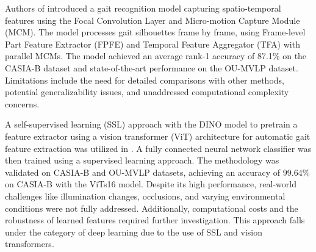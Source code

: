 \documentclass[a4paper]{article}
\begin{document}
Authors of \cite{19} introduced a gait recognition model capturing spatio-temporal features using the Focal Convolution Layer and Micro-motion Capture Module (MCM). The model processes gait silhouettes frame by frame, using Frame-level Part Feature Extractor (FPFE) and Temporal Feature Aggregator (TFA) with parallel MCMs. The model achieved an average rank-1 accuracy of 87.1\% on the CASIA-B dataset and state-of-the-art performance on the OU-MVLP dataset. Limitations include the need for detailed comparisons with other methods, potential generalizability issues, and unaddressed computational complexity concerns.

A self-supervised learning (SSL) approach with the DINO model to pretrain a feature extractor using a vision transformer (ViT) architecture for automatic gait feature extraction was utilized in \cite{20}. A fully connected neural network classifier was then trained using a supervised learning approach. The methodology was validated on CASIA-B and OU-MVLP datasets, achieving an accuracy of 99.64\% on CASIA-B with the ViTs16 model. Despite its high performance, real-world challenges like illumination changes, occlusions, and varying environmental conditions were not fully addressed. Additionally, computational costs and the robustness of learned features required further investigation. This approach falls under the category of deep learning due to the use of SSL and vision transformers.
\end{document}
